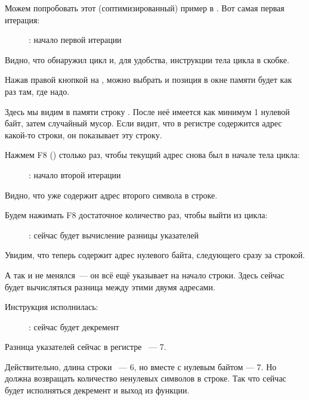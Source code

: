 ﻿\clearpage
{}
\myindex{\olly}

Можем попробовать этот (соптимизированный) пример в \olly.  Вот самая первая итерация:

\begin{figure}[H]
\centering
{}
\caption{\olly: начало первой итерации}
\label{fig:strlen_olly_1}
\end{figure}

Видно, что \olly обнаружил цикл и, для удобства,  инструкции тела цикла в скобке.

Нажав правой кнопкой на \EAX, можно выбрать  
и позиция в окне памяти будет как раз там, где надо.

Здесь мы видим в памяти строку .
После неё имеется как минимум 1 нулевой байт, затем случайный мусор.
Если \olly видит, что в регистре содержится адрес какой-то строки, он показывает эту строку.

\clearpage
Нажмем F8 (\stepover) столько раз, чтобы текущий адрес снова был в начале тела цикла:

\begin{figure}[H]
\centering
{}
\caption{\olly: начало второй итерации}
\label{fig:strlen_olly_2}
\end{figure}

Видно, что \EAX уже содержит адрес второго символа в строке.

\clearpage
Будем нажимать F8 достаточное количество раз, чтобы выйти из цикла:

\begin{figure}[H]
\centering
{}
\caption{\olly: сейчас будет вычисление разницы указателей}
\label{fig:strlen_olly_3}
\end{figure}

Увидим, что \EAX теперь содержит адрес нулевого байта, следующего сразу за строкой.

А \EDX так и не менялся~--- он всё ещё указывает на начало строки.
Здесь сейчас будет вычисляться разница между этими двумя адресами.

\clearpage
Инструкция \SUB исполнилась:

\begin{figure}[H]
\centering
{}
\caption{\olly: сейчас будет декремент \EAX}
\label{fig:strlen_olly_4}
\end{figure}

Разница указателей сейчас в регистре \EAX~--- 7.

Действительно, длина строки ~--- 6, 
но вместе с нулевым байтом --- 7.
Но  должна возвращать количество ненулевых символов в строке.
Так что сейчас будет исполняться декремент и выход из функции.

